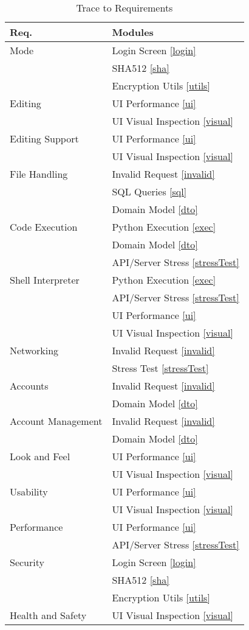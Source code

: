 \documentclass[12pt, titlepage]{article}
\begin{document}
\begin{table}
\centering
\begin{tabular}{p{} p{}}
\toprule
\textbf{Req.} & \textbf{Modules}\\
\midrule
    Mode & Login Screen \ref{login}\\
				 & SHA512 \ref{sha}\\
				 & Encryption Utils \ref{utils}\\
    Editing & UI Performance \ref{ui}\\
				 &  UI Visual Inspection \ref{visual}\\
    Editing Support & UI Performance \ref{ui}\\
			   &  UI Visual Inspection \ref{visual}\\
    File Handling & Invalid Request \ref{invalid}\\
				 & SQL Queries \ref{sql}\\
				 & Domain Model \ref{dto}\\
    Code Execution & Python Execution \ref{exec}\\
				 & Domain Model \ref{dto}\\
				 & API/Server Stress \ref{stressTest}\\
    Shell Interpreter & Python Execution \ref{exec}\\
				 & API/Server Stress \ref{stressTest}\\
				 & UI Performance \ref{ui}\\
				 & UI Visual Inspection \ref{visual}\\
    Networking & Invalid Request \ref{invalid}\\
				 & Stress Test \ref{stressTest}\\
    Accounts & Invalid Request \ref{invalid}\\
				 & Domain Model \ref{dto}\\
    Account Management & Invalid Request \ref{invalid}\\
				 & Domain Model \ref{dto}\\
    Look and Feel & UI Performance \ref{ui}\\
				 & UI Visual Inspection \ref{visual}\\
    Usability & UI Performance \ref{ui}\\
				 & UI Visual Inspection \ref{visual}\\
    Performance & UI Performance \ref{ui}\\
				 & API/Server Stress \ref{stressTest}\\
    Security & Login Screen \ref{login}\\ 
				 & SHA512 \ref{sha}\\
				 & Encryption Utils \ref{utils}\\
    Health and Safety & UI Visual Inspection \ref{visual}\\
\bottomrule
\end{tabular}
\caption{Trace to Requirements }
\label{TblRT}
\end{table}
\end{document}
